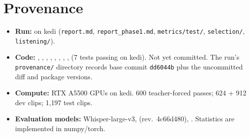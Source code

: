 \documentclass[11pt]{article}
\begin{document}
\appendix
\section{Provenance}
\begin{itemize}
\item \textbf{Run:}  on kedi (\texttt{report.md}, \texttt{report\_phase1.md}, \texttt{metrics/test/}, \texttt{selection/}, \texttt{listening/}).
\item \textbf{Code:} , , , , , , , ,  (7 tests passing on kedi). Not yet committed. The run's \texttt{provenance/} directory records base commit \texttt{dd6044b} plus the uncommitted diff and package versions.
\item \textbf{Compute:} RTX A5500 GPUs on kedi. 600 teacher-forced passes; 624 + 912 dev clips; 1{,}197 test clips.
\item \textbf{Evaluation models:} Whisper-large-v3,  (rev.\ 4c66d480), . Statistics are implemented in numpy/torch.
\end{itemize}
\end{document}
